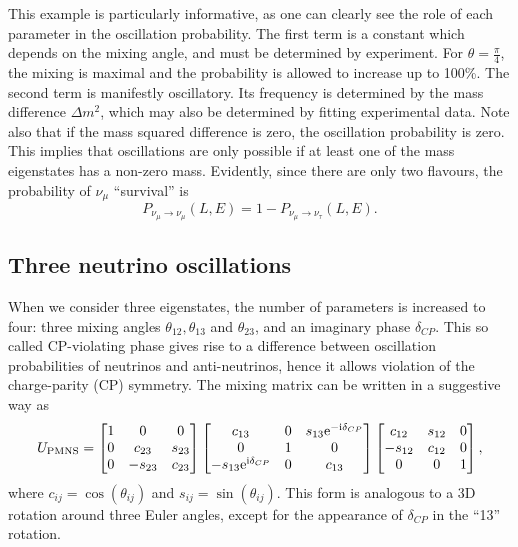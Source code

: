 This example is particularly informative, as one can clearly see the role of
each parameter in the oscillation probability. The first term is a constant
which depends on the mixing angle, and must be determined by experiment. For
$\theta = \frac{\pi}{4}$, the mixing is maximal and the probability is allowed
to increase up to 100\%. The second term is manifestly oscillatory. Its
frequency is determined by the mass difference $\Delta m^2$, which may also be
determined by fitting experimental data. Note also that if the mass squared
difference is zero, the oscillation probability is zero. This implies that
oscillations are only possible if at least one of the mass eigenstates has a
non-zero mass.
Evidently, since there are only two flavours, the probability of $\nu_\mu$
``survival'' is
$$P_{\nu_\mu \rightarrow \nu_\mu}(L, E) = 1 - P_{\nu_\mu \rightarrow
\nu_\tau}(L, E).$$



\subsection{Three neutrino oscillations}
When we consider three eigenstates, the number of parameters is increased to
four\cite{langacker}:
three mixing angles $\theta_{12}, \theta_{13}$ and $\theta_{23}$, and an
imaginary phase $\delta_{CP}$. This so called CP-violating phase gives rise to
a difference between oscillation probabilities of neutrinos and anti-neutrinos,
hence it allows violation of the charge-parity (CP) symmetry. 
The mixing matrix can be written in a suggestive way as
\begin{equation}\label{eq:PMNS}
U_{\mathrm{PMNS}} = 
\begin{bmatrix} 1 & 0 & 0 \\ 0 & c_{23} & s_{23} \\ 0 & -s_{23} & c_{23} \end{bmatrix}
\begin{bmatrix} c_{13} & 0 & s_{13} \mathrm{e}^{-\mathrm{i} \delta_{CP}} \\ 0 & 1 & 0 \\
								-s_{13} \mathrm{e}^{\mathrm{i} \delta_{CP}} & 0 & c_{13} \end{bmatrix} 
\begin{bmatrix} c_{12} & s_{12} & 0 \\ -s_{12} & c_{12} & 0 \\ 0 & 0 & 1 \end{bmatrix}
,\end{equation}
where $c_{ij} = \cos(\theta_{ij})$ and $s_{ij} = \sin(\theta_{ij})$.
This form is analogous to a 3D rotation around three Euler angles, except for
the appearance of $\delta_{CP}$ in the ``13'' rotation.

